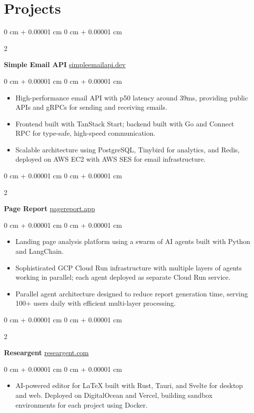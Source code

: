 \documentclass[10pt, letterpaper]{article}
\newenvironment{highlights}{
    \begin{itemize}[
        topsep=0.10 cm,
        parsep=0.10 cm,
        partopsep=0pt,
        itemsep=0pt,
        leftmargin=0 cm + 10pt
    ]
}{
    \end{itemize}
} %
\newenvironment{onecolentry}{
    \begin{adjustwidth}{
        0 cm + 0.00001 cm
    }{
        0 cm + 0.00001 cm
    }
}{
    \end{adjustwidth}
} %
\newenvironment{twocolentry}[2][]{
    \onecolentry
    \def\secondColumn{#2}
    \setcolumnwidth{\fill, 4.5 cm}
    \begin{paracol}{2}
}{
    \switchcolumn \raggedleft \secondColumn
    \end{paracol}
    \endonecolentry
} %
\let\hrefWithoutArrow\href
\begin{document}
    \section{Projects}
    \begin{twocolentry}{
        \hrefWithoutArrow{https://simpleemailapi.dev}{simpleemailapi.dev}
    }
        \textbf{Simple Email API}\end{twocolentry}
    \begin{onecolentry}
        \begin{highlights}
            \item High-performance email API with p50 latency around 39ms, providing public APIs and gRPCs for sending and receiving emails.
            \item Frontend built with TanStack Start; backend built with Go and Connect RPC for type-safe, high-speed communication.
            \item Scalable architecture using PostgreSQL, Tinybird for analytics, and Redis, deployed on AWS EC2 with AWS SES for email infrastructure.
        \end{highlights}
    \end{onecolentry}

    \vspace{0.2 cm}

    \begin{twocolentry}{
        \hrefWithoutArrow{https://pagereport.app}{pagereport.app}
    }
        \textbf{Page Report}\end{twocolentry}
    \begin{onecolentry}
        \begin{highlights}
            \item Landing page analysis platform using a swarm of AI agents built with Python and LangChain.
            \item Sophisticated GCP Cloud Run infrastructure with multiple layers of agents working in parallel; each agent deployed as separate Cloud Run service.
            \item Parallel agent architecture designed to reduce report generation time, serving 100+ users daily with efficient multi-layer processing.
        \end{highlights}
    \end{onecolentry}

    \vspace{0.2 cm}

    \begin{twocolentry}{
        \hrefWithoutArrow{https://researgent.com}{researgent.com}
    }
        \textbf{Researgent}\end{twocolentry}
    \begin{onecolentry}
        \begin{highlights}
            \item AI-powered editor for LaTeX built with Rust, Tauri, and Svelte for desktop and web. Deployed on DigitalOcean and Vercel, building sandbox environments for each project using Docker.
        \end{highlights}
    \end{onecolentry}
\end{document}
